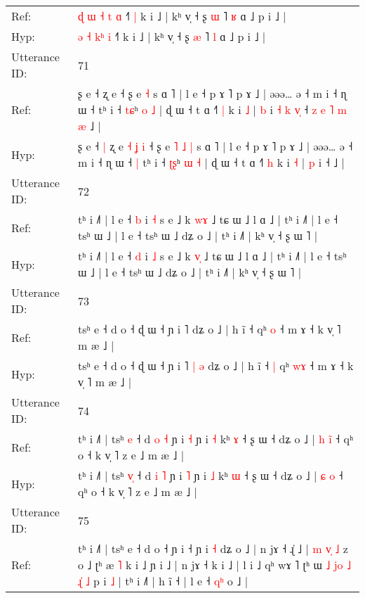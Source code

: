 \documentclass[10pt]{article}
\DeclareRobustCommand{\hl}[1]{{\textcolor{red}{#1}}}
\begin{document}
\begin{longtable}{ll}
Ref: & \hl{ɖ} \hl{ɯ} \hl{˧}\hl{ }\hl{t} \hl{ɑ} ˧˥\hl{ }\hl{|} k i ˩ | kʰ v̩ ˧ ʂ \hl{ɯ} ˥ \hl{ʁ} ɑ ˩ p i ˩ |
 \\
Hyp: & \hl{ə} \hl{˧} \hl{}\hl{k}\hl{ʰ} \hl{i} ˧˥\hl{}\hl{} k i ˩ | kʰ v̩ ˧ ʂ \hl{æ} ˥ \hl{l} ɑ ˩ p i ˩ |
 \\
\midrule
Utterance ID: & 71 \\
Ref: & ʂ e ˧\hl{}\hl{} ʐ e\hl{}\hl{}\hl{}\hl{}\hl{}\hl{} ˧ ʂ e\hl{}\hl{}\hl{}\hl{} \hl{˧} s ɑ ˥ | l e ˧ p ɤ ˥ p ɤ ˩ | əəə… ə ˧ m i ˧ ɳ ɯ ˧\hl{}\hl{} tʰ i ˧ \hl{t}\hl{ɕ}ʰ \hl{o} \hl{˩} | ɖ ɯ ˧ t ɑ ˧˥ \hl{|} k i \hl{˩} | \hl{b} i\hl{ }\hl{˧}\hl{ }\hl{k}\hl{ }\hl{v}\hl{̩} ˧\hl{ }\hl{z}\hl{ }\hl{e}\hl{ }\hl{˥}\hl{ }\hl{m}\hl{ }\hl{æ} ˩ |
 \\
Hyp: & ʂ e ˧\hl{ }\hl{|} ʐ e\hl{ }\hl{˧}\hl{ }\hl{ʝ}\hl{ }\hl{i} ˧ ʂ e\hl{ }\hl{˥}\hl{ }\hl{˩} \hl{|} s ɑ ˥ | l e ˧ p ɤ ˥ p ɤ ˩ | əəə… ə ˧ m i ˧ ɳ ɯ ˧\hl{ }\hl{|} tʰ i ˧ \hl{ʈ}\hl{ʂ}ʰ \hl{ɯ} \hl{˧} | ɖ ɯ ˧ t ɑ ˧˥ \hl{h} k i \hl{˧} | \hl{p} i\hl{}\hl{}\hl{}\hl{}\hl{}\hl{}\hl{} ˧\hl{}\hl{}\hl{}\hl{}\hl{}\hl{}\hl{}\hl{}\hl{}\hl{} ˩ |
 \\
\midrule
Utterance ID: & 72 \\
Ref: & tʰ i ˩˥ | l e ˧ \hl{b} i \hl{˧} s e ˩ k \hl{w}\hl{ɤ} ˩ tɕ ɯ ˩ l ɑ ˩ | tʰ i ˩˥ | l e ˧ tsʰ ɯ ˩ | l e ˧ tsʰ ɯ ˩ dʑ o ˩ | tʰ i ˩˥ | kʰ v̩ ˧ ʂ ɯ ˥ |
 \\
Hyp: & tʰ i ˩˥ | l e ˧ \hl{d} i \hl{˩} s e ˩ k \hl{v}\hl{̩} ˩ tɕ ɯ ˩ l ɑ ˩ | tʰ i ˩˥ | l e ˧ tsʰ ɯ ˩ | l e ˧ tsʰ ɯ ˩ dʑ o ˩ | tʰ i ˩˥ | kʰ v̩ ˧ ʂ ɯ ˥ |
 \\
\midrule
Utterance ID: & 73 \\
Ref: & tsʰ e ˧ d o ˧ ɖ ɯ ˧ ɲ i ˥\hl{}\hl{}\hl{}\hl{} dʑ o ˩ | h ĩ ˧\hl{}\hl{} qʰ \hl{}\hl{o} ˧ m ɤ ˧ k v̩ ˥ m æ ˩ |
 \\
Hyp: & tsʰ e ˧ d o ˧ ɖ ɯ ˧ ɲ i ˥\hl{ }\hl{|}\hl{ }\hl{ə} dʑ o ˩ | h ĩ ˧\hl{ }\hl{|} qʰ \hl{w}\hl{ɤ} ˧ m ɤ ˧ k v̩ ˥ m æ ˩ |
 \\
\midrule
Utterance ID: & 74 \\
Ref: & tʰ i ˩˥ | tsʰ \hl{}\hl{e} ˧ d \hl{o} \hl{˧} ɲ i \hl{˧} ɲ i \hl{˧} kʰ \hl{ɤ} ˧ ʂ ɯ ˧ dʑ o ˩ | \hl{h} \hl{i}\hl{̃} ˧ qʰ o ˧ k v̩ ˥ z e ˩ m æ ˩ |
 \\
Hyp: & tʰ i ˩˥ | tsʰ \hl{v}\hl{̩} ˧ d \hl{i} \hl{˥} ɲ i \hl{˥} ɲ i \hl{˩} kʰ \hl{ɯ} ˧ ʂ ɯ ˧ dʑ o ˩ | \hl{ɕ} \hl{}\hl{o} ˧ qʰ o ˧ k v̩ ˥ z e ˩ m æ ˩ |
 \\
\midrule
Utterance ID: & 75 \\
Ref: & tʰ i ˩˥ | tsʰ e ˧ d o ˧ ɲ i ˧ ɲ i \hl{˧} dʑ o ˩ | n jɤ ˧ ɻ̍ ˩ |\hl{ }\hl{m}\hl{ }\hl{v}\hl{̩}\hl{ }\hl{˩} z o ˩ ʈʰ æ \hl{˥} k i ˩ ɲ i ˩ | n jɤ ˧ k i ˩ | l i ˩ qʰ wɤ \hl{}˥\hl{}\hl{} ʈʰ ɯ \hl{˩} \hl{j}\hl{o} \hl{˩} \hl{ɻ}\hl{̍} \hl{˩} p i \hl{˩} | tʰ i ˩˥ | h ĩ ˧ | l e ˧ \hl{q}\hl{ʰ} o ˩ |

\end{longtable}
\end{document}
